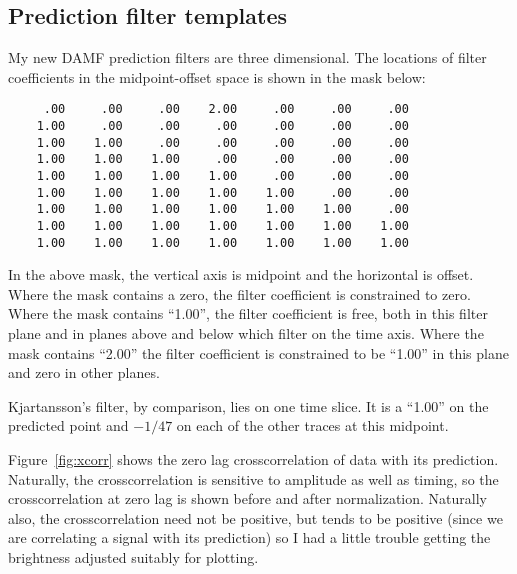 \subsection{Prediction filter templates}
My new DAMF prediction filters are three dimensional.
The locations of filter coefficients in the
midpoint-offset space is shown in the mask below:
\begin{verbatim}
     .00     .00     .00    2.00     .00     .00     .00
    1.00     .00     .00     .00     .00     .00     .00
    1.00    1.00     .00     .00     .00     .00     .00
    1.00    1.00    1.00     .00     .00     .00     .00
    1.00    1.00    1.00    1.00     .00     .00     .00
    1.00    1.00    1.00    1.00    1.00     .00     .00
    1.00    1.00    1.00    1.00    1.00    1.00     .00
    1.00    1.00    1.00    1.00    1.00    1.00    1.00
    1.00    1.00    1.00    1.00    1.00    1.00    1.00
\end{verbatim}
\par
In the above mask, the vertical axis is midpoint and the horizontal is offset.
Where the mask contains a zero,
the filter coefficient is constrained to zero.
Where the mask contains ``1.00'',
the filter coefficient is free,
both in this filter plane and in planes above and below
which filter on the time axis.
Where the mask contains ``2.00''
the filter coefficient is constrained to be ``1.00''
in this plane and zero in other planes.
\par
Kjartansson's filter, by comparison, lies on one time slice.
It is a ``1.00'' on the predicted point
and $-1/47$ on each of the other traces at this midpoint.
\par
Figure~\ref{fig:xcorr} shows
the zero lag crosscorrelation of data with its prediction.
Naturally, the crosscorrelation is sensitive to amplitude
as well as timing, so the crosscorrelation at zero lag
is shown before and after normalization.
Naturally also, the crosscorrelation need not be positive,
but tends to be positive
(since we are correlating a signal with its prediction)
so I had a little trouble getting the brightness adjusted 
suitably for plotting.



